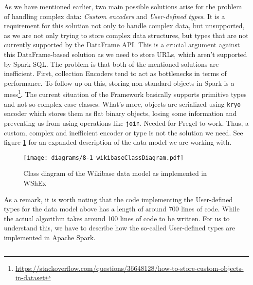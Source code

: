 As we have mentioned earlier, two main possible solutions arise for the problem of handling complex data: \textit{Custom encoders} and \textit{User-defined types}. It is a requirement for this solution not only to handle complex data, but unsupported, as we are not only trying to store complex data structures, but types that are not currently supported by the DataFrame API. This is a crucial argument against this DataFrame-based solution as we need to store URLs, which aren't supported by Spark SQL. The problem is that both of the mentioned solutions are inefficient. First, collection Encoders tend to act as bottlenecks in terms of performance. To follow up on this, storing non-standard objects in Spark is a mess\footnote{\url{https://stackoverflow.com/questions/36648128/how-to-store-custom-objects-in-dataset}}. The current situation of the Framework basically supports primitive types and not so complex case classes. What's more, objects are serialized using \texttt{kryo} encoder which stores them as flat binary objects, losing some information and preventing us from using operations like \texttt{join}. Needed for Pregel to work. Thus, a custom, complex and inefficient encoder or type is not the solution we need. See figure \ref{fig:wikibaseClassDiagram} for an expanded description of the data model we are working with.

\begin{figure}[ht]
    \centering
    \texttt{[image: diagrams/8-1\_wikibaseClassDiagram.pdf]}
    \caption[Class diagram of the Wikibase data model as implemented in WShEx]{Class diagram of the Wikibase data model as implemented in WShEx\footnotemark}
    \label{fig:wikibaseClassDiagram}
\end{figure}

As a remark, it is worth noting that the code implementing the User-defined types for the data model above has a length of around 700 lines of code. While the actual algorithm takes around 100 lines of code to be written. For us to understand this, we have to describe how the so-called User-defined types are implemented in Apache Spark.


\begin{code}
    \inputminted{scala}{code/listings/8-1_udt.scala}
\end{code}

